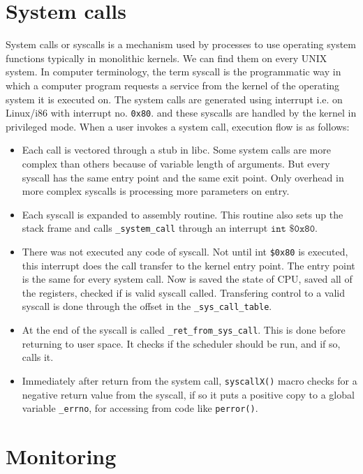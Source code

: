 \section{System calls}
System calls or syscalls is a mechanism used by processes to use operating system functions typically in monolithic kernels.
We can find them on every UNIX system.
In computer terminology, the term syscall is the programmatic way in which a computer program requests a service from the kernel of the operating system it is executed on. The system calls are generated using interrupt i.e. on Linux/i86 with interrupt no. \texttt{0x80}. and these syscalls are handled by the kernel in privileged mode.
When a user invokes a system call, execution flow is as follows:
\begin{itemize}
	\item Each call is vectored through a stub in libc. Some system calls are more complex than others because of variable length of arguments. But every syscall has the same entry point and the same exit point. Only overhead in more complex syscalls is processing more parameters on entry.
	\item Each syscall is expanded to assembly routine. This routine also sets up the stack frame and calls \texttt{\_system\_call\(\)} through an interrupt \( \texttt{int \$0x80} \).
	\item There was not executed any code of syscall. Not until int \texttt{\$0x80} is executed, this interrupt does the call transfer to the kernel entry point. The entry point is the same for every system call. Now is saved the state of CPU, saved all of the registers, checked if is valid syscall called. Transfering control to a valid syscall is done through the offset in the \texttt{\_sys\_call\_table}.
	\item At the end of the syscall is called \texttt{\_ret\_from\_sys\_call\(\)}. This is done before returning to user space. It checks if the scheduler should be run, and if so, calls it.
	\item Immediately after return from the system call, \texttt{syscallX()} macro checks for a negative return value from the syscall, if so it puts a positive copy to a global variable \texttt{\_errno}, for accessing from code like \texttt{perror()}.
\end{itemize}

% 

\section{Monitoring}
